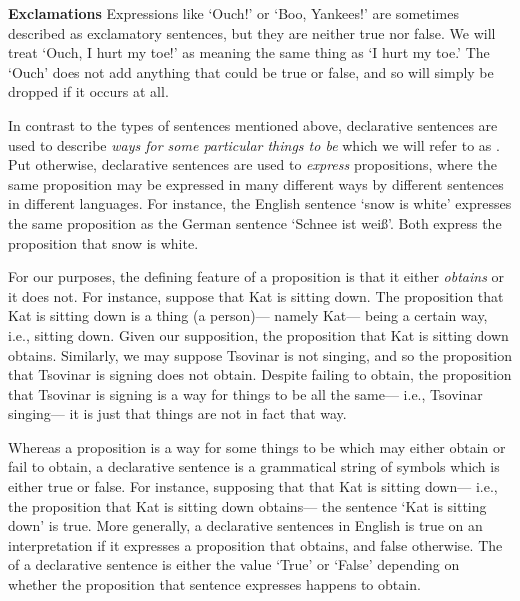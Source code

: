 \textbf{Exclamations} Expressions like `Ouch!' or `Boo, Yankees!' are sometimes described as exclamatory sentences, but they are neither true nor false.
We will treat `Ouch, I hurt my toe!' as meaning the same thing as `I hurt my toe.'
The `Ouch' does not add anything that could be true or false, and so will simply be dropped if it occurs at all.


In contrast to the types of sentences mentioned above, declarative sentences are used to describe \textit{ways for some particular things to be} which we will refer to as .
Put otherwise, declarative sentences are used to \textit{express} propositions, where the same proposition may be expressed in many different ways by different sentences in different languages.
For instance, the English sentence `snow is white' expresses the same proposition as the German sentence `Schnee ist wei\ss'.
Both express the proposition that snow is white.

For our purposes, the defining feature of a proposition is that it either \textit{obtains} or it does not.
For instance, suppose that Kat is sitting down.
The proposition that Kat is sitting down is a thing (a person)--- namely Kat--- being a certain way, i.e., sitting down.
Given our supposition, the proposition that Kat is sitting down obtains.
Similarly, we may suppose Tsovinar is not singing, and so the proposition that Tsovinar is signing does not obtain.
Despite failing to obtain, the proposition that Tsovinar is signing is a way for things to be all the same--- i.e., Tsovinar singing--- it is just that things are not in fact that way.

Whereas a proposition is a way for some things to be which may either obtain or fail to obtain, a declarative sentence is a grammatical string of symbols which is either true or false.
For instance, supposing that that Kat is sitting down--- i.e., the proposition that Kat is sitting down obtains--- the sentence `Kat is sitting down' is true.
More generally, a declarative sentences in English is true on an interpretation if it expresses a proposition that obtains, and false otherwise.
The  of a declarative sentence is either the value `True' or `False' depending on whether the proposition that sentence expresses happens to obtain.

